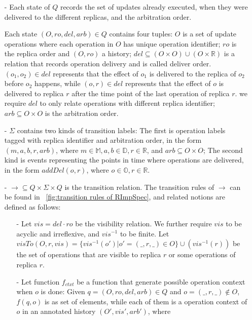 \begin{itemize}
\setlength{\itemsep}{0.5pt}
\item[-] Each state of $Q$ records the set of updates already executed, when they were delivered to the different replicas, and the arbitration order. 
    
    Each state $(O,\mathit{ro},\mathit{del},\mathit{arb}) \in Q$ contains four tuples: $O$ is a set of update operations where each operation in $O$ has unique operation identifier; $\mathit{ro}$ is the replica order and $(O,\mathit{ro})$ a history; $\mathit{del} \subseteq (O \times O) \cup (O \times \mathbb{R})$ is a relation that records operation delivery and is called deliver order. $(o_1,o_2) \in \mathit{del}$ represents that the effect of $o_1$ is delivered to the replica of $o_2$ before $o_2$ happens, while $(o,r) \in \mathit{del}$ represents that the effect of $o$ is delivered to replica $r$ after the time point of the last operation of replica $r$. we require $\mathit{del}$ to only relate operations with different replica identifier; $\mathit{arb} \subseteq O \times O$ is the arbitration order.

\item[-] $\Sigma$ contains two kinds of transition labels: The first is operation labels tagged with replica identifier and arbitration order, in the form $(m,a,b,r,\mathit{arb})$, where $m \in \mathbb{M}, a,b \in \mathbb{D}, r \in \mathbb{R}$, and $arb \subseteq O \times O$; The second kind is events representing the points in time where operations are delivered, in the form $addDel(o,r)$, where $o \in \mathbb{O}, r \in \mathbb{R}$. 

\item[-] $\rightarrow \subseteq Q \times \Sigma \times Q$ is the transition relation. The transition rules of $\rightarrow$ can be found in \figurename~\ref{fig:transition rules of RImpSpec}, and related notions are defined as follows: 


    \begin {itemize}
    \item[-] Let $\mathit{vis} = \mathit{del} \cdot \mathit{ro}$ be the visibility relation. We further require $\mathit{vis}$ to be acyclic and irreflexive, and $\mathit{vis}^{-1}$ to be finite. Let $visTo(O,r,\mathit{vis}) = \{ vis^{-1}(o') \vert o'=(\_,r,\_) \in O \} \cup (vis^{-1}(r))$ be the set of operations that are visible to replica $r$ or some operations of replica $r$.

    \item[-] Let function $f_{\mathit{ctxt}}$ be a function that generate possible operation context when $o$ is done: Given $q = (O,\mathit{ro},\mathit{del},\mathit{arb}) \in Q$ and $o=(\_,r,\_) \notin O$, $f(q,o)$ is as set of elements, while each of them is a operation context of $o$ in an annotated history $(O',\mathit{vis}',\mathit{arb}')$, where
    

\end{itemize}
\end{itemize}
